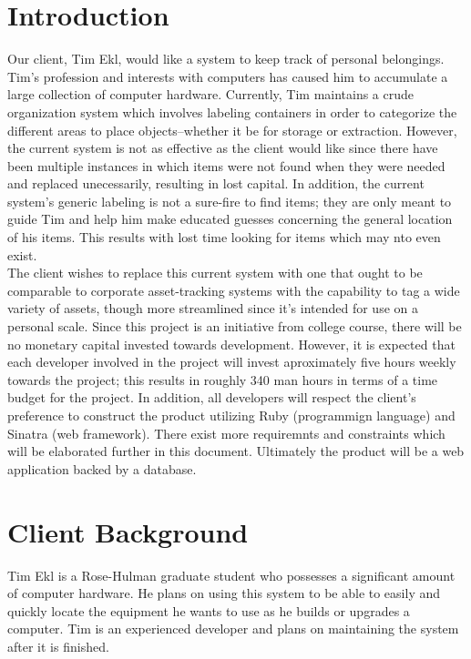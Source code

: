 \documentclass{article}
\begin{document}
\section{Introduction}
Our client, Tim Ekl, would like a system to keep track of personal belongings. Tim's profession and interests with computers has caused him to accumulate a large collection of computer hardware. Currently, Tim maintains a crude organization system which involves labeling containers in order to categorize the different areas to place objects--whether it be for storage or extraction. However, the current system is not as effective as the client would like since there have been multiple instances in which items were not found when they were needed and replaced unecessarily, resulting in lost capital. In addition, the current system's generic labeling is not a sure-fire to find items; they are only meant to guide Tim and help him make educated guesses concerning the general location of his items. This results with lost time looking for items which may nto even exist.\\
The client wishes to replace this current system with one that ought to be comparable to corporate asset-tracking systems with the capability to tag a wide variety of assets, though more streamlined since it's intended for use on a personal scale. Since this project is an initiative from college course, there will be no monetary capital invested towards development. However, it is expected that each developer involved in the project will invest aproximately five hours weekly towards the project; this results in roughly 340 man hours in terms of a time budget for the project. In addition, all developers will respect the client's preference to construct the product utilizing Ruby (programmign language) and Sinatra (web framework). There exist more requiremnts and constraints which will be elaborated further in this document. Ultimately the product will be a web application backed by a database.

\section{Client Background}
Tim Ekl is a Rose-Hulman graduate student who possesses a significant amount of computer hardware.  He plans on using this system to be able to easily and quickly locate the equipment he wants to use as he builds or upgrades a computer.  Tim is an experienced developer and plans on maintaining the system after it is finished.  
\end{document}
